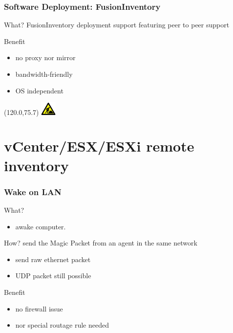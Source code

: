 \documentclass{beamer}
\newcommand{\WorkInProgress}{%
\begin{textblock}{14}(120.0,75.7)
\includegraphics[height=0.7cm]{./pics/workinprogress.jpg}
\end{textblock}
  }
\begin{document}
\begin{frame}
    \frametitle{Software Deployment: FusionInventory}

    \begin{block}{What?}
    FusionInventory deployment support featuring peer to peer support
    \end{block}

    \begin{block}{Benefit}
    \begin{itemize}
        \item no proxy nor mirror
        \item bandwidth-friendly
        \item OS independent
    \end{itemize}
    \end{block}

\WorkInProgress
\end{frame}


\section{vCenter/ESX/ESXi remote inventory}


\begin{frame}
    \frametitle{Wake on LAN}

    \begin{block}{What?}
    \begin{itemize}
        \item awake computer.
    \end{itemize}
    \end{block}

\pause

    \begin{block}{How?}
    send the Magic Packet from an agent in the same network
    \begin{itemize}
        \item send raw ethernet packet
        \item UDP packet still possible
    \end{itemize}
    \end{block}

\pause

    \begin{block}{Benefit}
    \begin{itemize}
        \item no firewall issue
        \item nor special routage rule needed
    \end{itemize}
    \end{block}

\end{frame}
\end{document}
